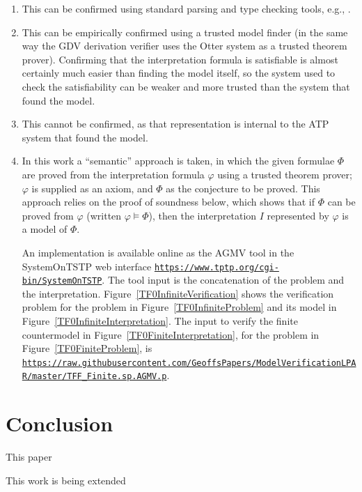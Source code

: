 \documentclass{easychair}
\newcommand{\smalltt}[1]{\small \texttt{#1}}
\begin{document}
\begin{enumerate}
\item This can be confirmed using standard parsing and type checking tools, e.g., \cite{VS06,HR15}.
\item This can be empirically confirmed using a trusted model finder (in the same way the GDV 
      derivation verifier \cite{Sut06} uses the Otter system \cite{McC03-Otter} as a trusted 
      theorem prover).
      Confirming that the interpretation formula is satisfiable is almost certainly much 
      easier than finding the model itself, so the system used to check the satisfiability can 
      be weaker and more trusted than the system that found the model.
\item This cannot be confirmed, as that representation is internal to the ATP system that found
      the model.
\item In this work a ``semantic'' approach is taken, in which the given formulae $\Phi$ are proved 
      from the interpretation formula $\varphi$ using a trusted theorem prover; $\varphi$ is 
      supplied as an axiom, and $\Phi$ as the conjecture to be proved.
      This approach relies on the proof of soundness below, which shows that if $\Phi$ can be 
      proved from $\varphi$ (written $\varphi \models \Phi$), then the interpretation $I$ 
      represented by $\varphi$ is a model of $\Phi$.

      An implementation is available online as the AGMV tool in the SystemOnTSTP \cite{Sut07-CSR} 
      web interface {\smalltt{\url{https://www.tptp.org/cgi-bin/SystemOnTSTP}}}.
      The tool input is the concatenation of the problem and the interpretation.
      Figure~\ref{TF0InfiniteVerification} shows the verification problem for the problem in 
      Figure~\ref{TF0InfiniteProblem} and its model in Figure~\ref{TF0InfiniteInterpretation}.
      The input to verify the finite countermodel in Figure~\ref{TF0FiniteInterpretation}, for the 
      problem in Figure~\ref{TF0FiniteProblem}, is
      {\smalltt{\url{https://raw.githubusercontent.com/GeoffsPapers/ModelVerificationLPAR/master/TFF_Finite.sp.AGMV.p}}}.
\end{enumerate}

\section{Conclusion}
\label{Conclusion}

This paper 

This work is being extended 



\end{document}
